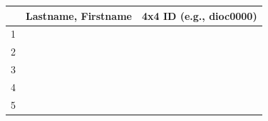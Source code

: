 \documentclass[letterpaper,11pt,twoside]{article}
\begin{document}
\begin{center}
\begin{tabular}{c|c|c|}\cline{2-3}
 & Lastname, Firstname
 & 4x4 ID (e.g., dioc0000)
 \\\hline
\multicolumn{1}{|c|}{\multirow{2}{*}{1}}
& \phantom{ABCDEFGHIJKLMNOPQRSTUVWXYZ0123456789} & \phantom{dioc0000dioc0000} \\
\multicolumn{1}{|c|}{}
           & \phantom{ABCDEFGHIJKLMNOPQRSTUVWXYZ0123456789} & \phantom{dioc0000dioc0000} \\\hline
\multicolumn{1}{|c|}{\multirow{2}{*}{2}}
& \phantom{ABCDEFGHIJKLMNOPQRSTUVWXYZ0123456789} & \phantom{dioc0000dioc0000} \\
\multicolumn{1}{|c|}{}
           & \phantom{ABCDEFGHIJKLMNOPQRSTUVWXYZ0123456789} & \phantom{dioc0000dioc0000} \\\hline
\multicolumn{1}{|c|}{\multirow{2}{*}{3}}
& \phantom{ABCDEFGHIJKLMNOPQRSTUVWXYZ0123456789} & \phantom{dioc0000dioc0000} \\
\multicolumn{1}{|c|}{}
           & \phantom{ABCDEFGHIJKLMNOPQRSTUVWXYZ0123456789} & \phantom{dioc0000dioc0000} \\\hline
\multicolumn{1}{|c|}{\multirow{2}{*}{4}}
& \phantom{ABCDEFGHIJKLMNOPQRSTUVWXYZ0123456789} & \phantom{dioc0000dioc0000} \\
\multicolumn{1}{|c|}{}
           & \phantom{ABCDEFGHIJKLMNOPQRSTUVWXYZ0123456789} & \phantom{dioc0000dioc0000} \\\hline
\multicolumn{1}{|c|}{\multirow{2}{*}{5}}
& \phantom{ABCDEFGHIJKLMNOPQRSTUVWXYZ0123456789} & \phantom{dioc0000dioc0000} \\
\multicolumn{1}{|c|}{}
           & \phantom{ABCDEFGHIJKLMNOPQRSTUVWXYZ0123456789} & \phantom{dioc0000dioc0000} \\\hline
\end{tabular}
\end{center}

\thispagestyle{empty}
\end{document}
